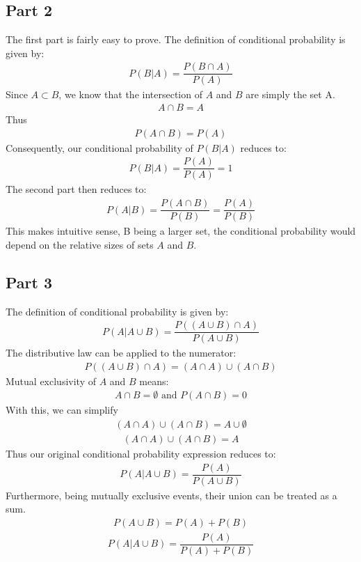\documentclass{article}
\begin{document}
\subsection*{Part 2}
The first part is fairly easy to prove. The definition of conditional probability is given by:
\begin{align*}
P(B|A) = \dfrac{P(B\cap A)}{P(A)}
\end{align*}
Since $A \subset B$, we know that the intersection of $A$ and $B$ are simply the set A.
\begin{align*}
A\cap B = A
\end{align*}
Thus
\begin{align*}
P(A\cap B) = P(A)
\end{align*}
Consequently, our conditional probability of $P(B|A)$ reduces to:
\begin{align*}
\boxed{P(B|A) = \dfrac{P(A)}{P(A)} = 1}
\end{align*}
The second part then reduces to:
\begin{align*}
\boxed{P(A|B) = \dfrac{P(A\cap B)}{P(B)}=\dfrac{P(A)}{P(B)}}
\end{align*}
This makes intuitive sense, B being a larger set, the conditional probability would depend on the relative sizes of sets $A$ and $B$.
\subsection*{Part 3}
The definition of conditional probability is given by:
\begin{align*}
P(A|A\cup B) = \dfrac{P((A\cup B)\cap A)}{P(A\cup B)}
\end{align*}
The distributive law can be applied to the numerator:
\begin{align*}
P((A\cup B)\cap A) = (A\cap A)\cup (A\cap B)
\end{align*}
Mutual exclusivity of $A$ and $B$ means:
\begin{align*}
A\cap B = \emptyset \text{ and } P(A\cap B) = 0
\end{align*}
With this, we can simplify 
\begin{align*}
(A\cap A)\cup (A\cap B) = A \cup \emptyset
\end{align*}
\begin{align*}
(A\cap A)\cup (A\cap B) = A
\end{align*}
Thus our original conditional probability expression reduces to:
\begin{align*}
P(A|A\cup B) = \dfrac{P(A)}{P(A\cup B)}
\end{align*}
Furthermore, being mutually exclusive events, their union can be treated as a sum.
\begin{align*}
P(A\cup B) = P(A) + P(B)
\end{align*}
\begin{align*}
\boxed{P(A|A\cup B) = \dfrac{P(A)}{P(A) + P(B)}}
\end{align*}
\end{document}
